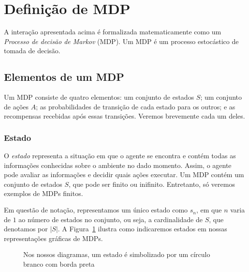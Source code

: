 \documentclass{article}
\begin{document}
    \section{Definição de MDP}
    
        A interação apresentada acima é formalizada matematicamente como um \emph{Processo de decisão de Markov} (MDP). Um MDP é um processo estocástico de tomada de decisão.
    
        \subsection{Elementos de um MDP}
    
            Um MDP consiste de quatro elementos: um conjunto de estados $S$; um conjunto de ações $A$; as probabilidades de transição de cada estado para os outros; e as recompensas recebidas após essas transições. Veremos brevemente cada um deles.
    
            \subsubsection{Estado}

                O \emph{estado} representa a situação em que o agente se encontra e contém todas as informações conhecidas sobre o ambiente no dado momento. Assim, o agente pode avaliar as informações e decidir quais ações executar. Um MDP contém um conjunto de estados $S$, que pode ser finito ou inifinito. Entretanto, só veremos exemplos de MDPs finitos. 
                
                Em questão de notação, representamos um único estado como $s_n$, em que $n$ varia de $1$ ao número de estados no conjunto, ou seja, a cardinalidade de $S$, que denotamos por $\vert S \vert$. A Figura~\ref{diag:state-node} ilustra como indicaremos estados em nossas representações gráficas de MDPs.

                \begin{figure}[ht]
                    \centering
                    \caption{Nos nossos diagramas, um estado é simbolizado por um círculo branco com borda preta}
                    \label{diag:state-node}
                \end{figure}
                
\end{document}

